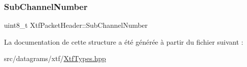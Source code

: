 \subsubsection{\texorpdfstring{Sub\+Channel\+Number}{SubChannelNumber}}
{\footnotesize\ttfamily uint8\+\_\+t Xtf\+Packet\+Header\+::\+Sub\+Channel\+Number}



La documentation de cette structure a été générée à partir du fichier suivant \+:\begin{DoxyCompactItemize}
\item 
src/datagrams/xtf/\hyperlink{XtfTypes_8hpp}{Xtf\+Types.\+hpp}\end{DoxyCompactItemize}
